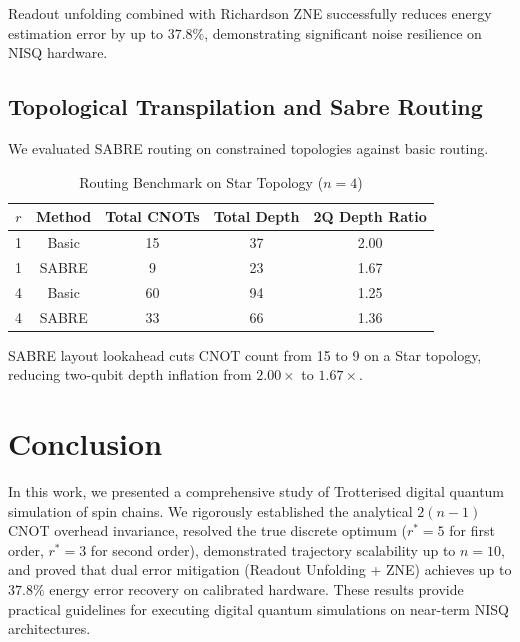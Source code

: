 \documentclass[conference]{IEEEtran}
\begin{document}
Readout unfolding combined with Richardson ZNE successfully reduces energy estimation error by up to \textbf{$37.8\%$}, demonstrating significant noise resilience on NISQ hardware.

\subsection{Topological Transpilation and Sabre Routing}
We evaluated SABRE routing on constrained topologies against basic routing.

\begin{table}[htbp]
\caption{Routing Benchmark on Star Topology ($n = 4$)}
\begin{center}
\begin{tabular}{ccccc}
\toprule
$r$ & Method & Total CNOTs & Total Depth & 2Q Depth Ratio \\
\midrule
1 & Basic & 15 & 37 & 2.00 \\
1 & SABRE & 9  & 23 & 1.67 \\
4 & Basic & 60 & 94 & 1.25 \\
4 & SABRE & 33 & 66 & 1.36 \\
\bottomrule
\end{tabular}
\end{center}
\label{tab:routing}
\end{table}

SABRE layout lookahead cuts CNOT count from 15 to 9 on a Star topology, reducing two-qubit depth inflation from $2.00\times$ to $1.67\times$.

\section{Conclusion}
In this work, we presented a comprehensive study of Trotterised digital quantum simulation of spin chains. We rigorously established the analytical $2(n-1)$ CNOT overhead invariance, resolved the true discrete optimum ($r^* = 5$ for first order, $r^* = 3$ for second order), demonstrated trajectory scalability up to $n = 10$, and proved that dual error mitigation (Readout Unfolding + ZNE) achieves up to $37.8\%$ energy error recovery on calibrated hardware. These results provide practical guidelines for executing digital quantum simulations on near-term NISQ architectures.
\end{document}
